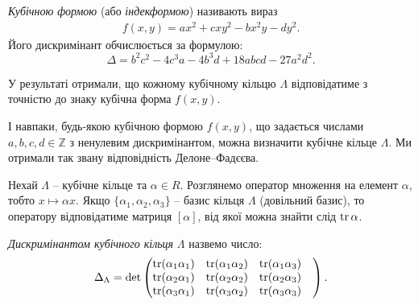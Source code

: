 \documentclass{thesis}
\begin{document}
\begin{definition}
\textit{Кубічною формою} (або \textit{індекформою}) називають вираз
\begin{align*}
f(x,y) = ax^2 + cxy^2 - bx^2y - dy^2.
\end{align*}
Його дискримінант обчислюється за формулою:
\begin{equation}
\label{discriminant_of_cubic_form}
\Delta = b^2 c^2 - 4c^3 a - 4b^3 d + 18 abcd - 27a^2d^2.
\end{equation}
\end{definition}

У результаті отримали, що кожному кубічному кільцю $\Lambda$ відповідатиме з точністю до знаку кубічна форма $f(x,y)$.

І навпаки, будь-якою кубічною формою $f(x,y)$, що задається числами $a,b,c,d \in \mathbb{Z}$ з ненулевим дискримінантом, можна визначити кубічне кільце $\Lambda$. Ми отримали так звану відповідність Делоне--Фадєєва.

Нехай $\Lambda$ -- кубічне кільце та $\alpha \in R$. Розглянемо оператор множення на елемент $\alpha$, тобто $x \mapsto \alpha x$. Якщо $\{\alpha_1,\alpha_2,\alpha_3\}$ -- базис кільця $\Lambda$ (довільний базис), то оператору відповідатиме матриця $[\alpha]$, від якої можна знайти слід $\operatorname{tr} \alpha$.
 
\begin{definition}
\textit{Дискримінантом кубічного кільця}  $\Lambda$ назвемо число:
\begin{align*}
\Delta_\Lambda = \det \begin{pmatrix}
\operatorname{tr}(\alpha_1 \alpha_1) & \operatorname{tr}(\alpha_1 \alpha_2) & \operatorname{tr}(\alpha_1 \alpha_3) & \\
\operatorname{tr}(\alpha_2 \alpha_1) & \operatorname{tr}(\alpha_2 \alpha_2) & \operatorname{tr}(\alpha_2 \alpha_3) & \\
\operatorname{tr}(\alpha_3 \alpha_1) & \operatorname{tr}(\alpha_3 \alpha_2) & \operatorname{tr}(\alpha_3 \alpha_3) & \\
\end{pmatrix}.
\end{align*}
\end{definition}
\end{document}
